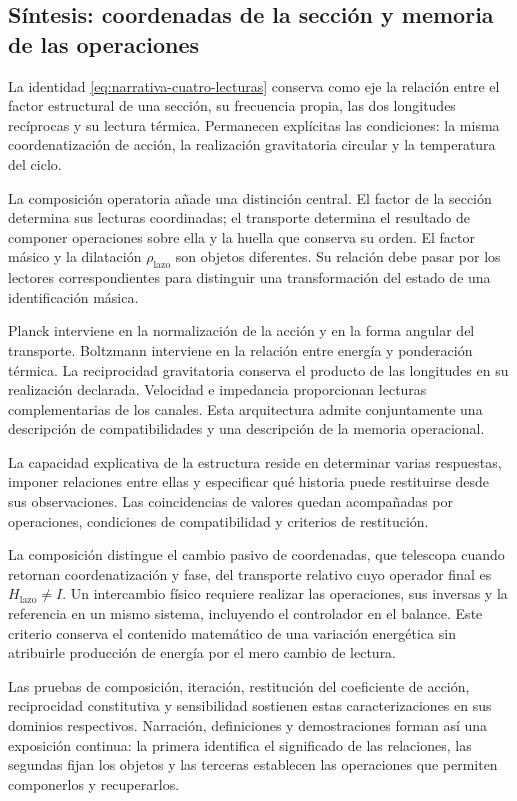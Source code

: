 \subsection{Síntesis: coordenadas de la sección y memoria de las operaciones}
\label{subsec:narrativa-sintesis}

La identidad \eqref{eq:narrativa-cuatro-lecturas} conserva como eje
la relación entre el factor estructural de una sección, su frecuencia
propia, las dos longitudes recíprocas y su lectura térmica. Permanecen
explícitas las condiciones: la misma coordenatización de acción, la realización
gravitatoria circular y la temperatura del ciclo.

La composición operatoria añade una distinción central. El factor
de la sección determina sus lecturas coordinadas; el transporte
determina el resultado de componer operaciones sobre ella y la
huella que conserva su orden. El factor másico y la dilatación
$\rho_{\mathrm{lazo}}$ son objetos diferentes. Su relación debe
pasar por los lectores correspondientes para distinguir una
transformación del estado de una identificación másica.

Planck interviene en la normalización de la acción y en la forma
angular del transporte. Boltzmann interviene en la relación entre
energía y ponderación térmica. La reciprocidad gravitatoria conserva
el producto de las longitudes en su realización declarada. Velocidad
e impedancia proporcionan lecturas complementarias de los canales.
Esta arquitectura admite conjuntamente una descripción de
compatibilidades y una descripción de la memoria operacional.

La capacidad explicativa de la estructura reside en determinar
varias respuestas, imponer relaciones entre ellas y especificar
qué historia puede restituirse desde sus observaciones. Las
coincidencias de valores quedan acompañadas por operaciones,
condiciones de compatibilidad y criterios de restitución.

La composición distingue el cambio pasivo de coordenadas, que
telescopa cuando retornan coordenatización y fase, del transporte relativo
cuyo operador final es $H_{\mathrm{lazo}}\ne I$. Un intercambio
físico requiere realizar las operaciones, sus inversas y la
referencia en un mismo sistema, incluyendo el controlador en
el balance. Este criterio conserva el contenido matemático
de una variación energética sin atribuirle producción de energía
por el mero cambio de lectura.

Las pruebas de composición, iteración, restitución del coeficiente
de acción, reciprocidad constitutiva y sensibilidad sostienen
estas caracterizaciones en sus dominios respectivos. Narración,
definiciones y demostraciones forman así una exposición continua:
la primera identifica el significado de las relaciones, las
segundas fijan los objetos y las terceras establecen las
operaciones que permiten componerlos y recuperarlos.
